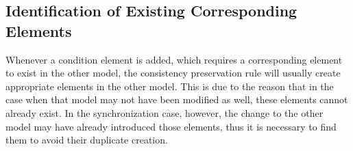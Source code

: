 


\subsection{Identification of Existing Corresponding Elements}
\label{chap:synchronization:achieving:identification}

Whenever a condition element is added, which requires a corresponding element to exist in the other model, the consistency preservation rule will usually create appropriate elements in the other model.
This is due to the reason that in the case when that model may not have been modified as well, these elements cannot already exist.
In the synchronization case, however, the change to the other model may have already introduced those elements, thus it is necessary to find them to avoid their duplicate creation.

